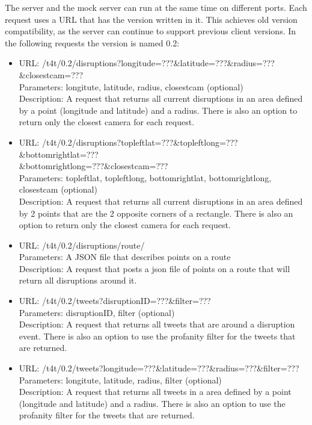 The server and the mock server can run at the same time on different ports. Each request uses a URL that has the version written in it. This achieves old version compatibility, as the server can continue to support previous client versions. In the following requests the version is named 0.2:
\begin{itemize}
\item URL: /t4t/0.2/disruptions?longitude=???\&latitude=???\&radius=???\&closestcam=??? \\
Parameters: longitute, latitude, radius, closestcam (optional) \\
Description: A request that returns all current disruptions in an area defined by a point (longitude and latitude) and a radius. There is also an option to return only the closest camera for each request.
\item URL: /t4t/0.2/disruptions?topleftlat=???\&topleftlong=???\&bottomrightlat=???\\\&bottomrightlong=???\&closestcam=??? \\
Parameters: topleftlat, topleftlong, bottomrightlat, bottomrightlong, closestcam (optional) \\
Description: A request that returns all current disruptions in an area defined by 2 points that are the 2 opposite corners of a rectangle. There is also an option to return only the closest camera for each request.
\item URL: /t4t/0.2/disruptions/route/ \\
Parameters: A JSON file that describes points on a route \\
Description: A request that posts a json file of points on a route that will return all disruptions around it.

\item URL: /t4t/0.2/tweets?disruptionID=???\&filter=??? \\
Parameters: disruptionID, filter (optional) \\
Description: A request that returns all tweets that are around a disruption event. There is also an option to use the profanity filter for the tweets that are returned.
\item URL: /t4t/0.2/tweets?longitude=???\&latitude=???\&radius=???\&filter=??? \\
Parameters: longitute, latitude, radius, filter (optional) \\
Description: A request that returns all tweets in a area defined by a point (longitude and latitude) and a radius. There is also an option to use the profanity filter for the tweets that are returned.


\end{itemize}
